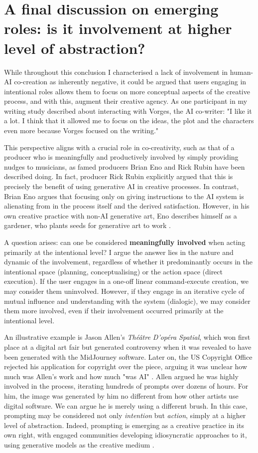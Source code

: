 \section{A final discussion on emerging roles: is it involvement at higher level of abstraction?}

While throughout this conclusion I characterised a lack of involvement in human-AI co-creation as inherently negative, it could be argued that users engaging in intentional roles allows them to focus on more conceptual aspects of the creative process, and with this, augment their creative agency. As one participant in my writing study described about interacting with Vorges, the AI co-writer: "I like it a lot. I think that it allowed me to focus on the ideas, the plot and the characters even more because Vorges focused on the writing."

This perspective aligns with a crucial role in co-creativity, such as that of a producer who is meaningfully and productively involved by simply providing nudges to musicians, as famed producers Brian Eno and Rick Rubin have been described doing. In fact, producer Rick Rubin explicitly argued that this is precisely the benefit of using generative AI in creative processes. In contrast, Brian Eno argues that focusing only on giving instructions to the AI system is alienating from in the process itself and the derived satisfaction. However, in his own creative practice with non-AI generative art, Eno describes himself as a gardener, who plants seeds for generative art to work \cite{Eno2007-fl}. 

A question arises: can one be considered \textbf{meaningfully involved} when acting primarily at the intentional level? I argue the answer lies in the nature and dynamic of the involvement, regardless of whether it predominantly occurs in the intentional space (planning, conceptualising) or the action space (direct execution). If the user engages in a one-off linear command-execute creation, we may consider them uninvolved. However, if they engage in an iterative cycle of mutual influence and understanding with the system (dialogic), we may consider them more involved, even if their involvement occurred primarily at the intentional level.

An illustrative example is Jason Allen's \textit{Théâtre D'opéra Spatial}, which won first place at a digital art fair but generated controversy when it was revealed to have been generated with the MidJourney software. Later on, the US Copyright Office rejected his application for copyright over the piece, arguing it was unclear how much was Allen's work and how much "was AI" \cite{US-Copyright-Office-Review-Board2023-nw}. Allen argued he was highly involved in the process, iterating hundreds of prompts over dozens of hours. For him, the image was generated by him no different from how other artists use digital software. We can argue he is merely using a different brush. In this case, prompting may be considered not only \textit{intention} but \textit{action}, simply at a higher level of abstraction.  Indeed, prompting is emerging as a creative practice in its own right, with engaged communities developing idiosyncratic approaches to it, using generative models as the creative medium \cite{Chang2023-tv, Smith2022-dm}.

